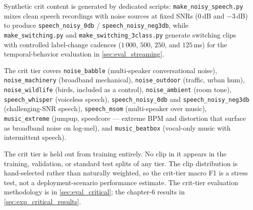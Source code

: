 Synthetic crit content is generated by dedicated scripts: \texttt{make\_noisy\_speech.py} mixes clean speech recordings with noise sources at fixed SNRs ($0$\,dB and $-3$\,dB) to produce \texttt{speech\_noisy\_0db} / \texttt{speech\_noisy\_neg3db}, while \texttt{make\_switching.py} and \texttt{make\_switching\_3class.py} generate switching clips with controlled label-change cadences ($1\,000$, $500$, $250$, and $125$\,ms) for the temporal-behavior evaluation in \cref{sec:eval_streaming}.

The crit tier covers \texttt{noise\_babble} (multi-speaker conversational noise), \texttt{noise\_machinery} (broadband mechanical), \texttt{noise\_outdoor} (traffic, urban hum), \texttt{noise\_wildlife} (birds, included as a control), \texttt{noise\_ambient} (room tone), \texttt{speech\_whisper} (voiceless speech), \texttt{speech\_noisy\_0db} and \texttt{speech\_noisy\_neg3db} (challenging-SNR speech), \texttt{speech\_msom} (multi-speaker over music), \texttt{music\_extreme} (jumpup, speedcore — extreme BPM and distortion that surface as broadband noise on log-mel), and \texttt{music\_beatbox} (vocal-only music with intermittent speech).

The crit tier is held out from training entirely.
No clip in it appears in the training, validation, or standard test splits of any tier.
The clip distribution is hand-selected rather than naturally weighted, so the crit-tier macro F1 is a stress test, not a deployment-scenario performance estimate.
The crit-tier evaluation methodology is in \cref{sec:eval_critical}; the chapter-6 results in \cref{sec:exp_critical_results}.

